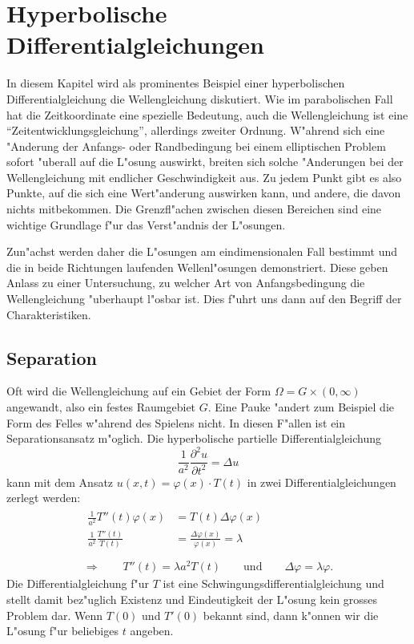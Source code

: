 %
%
%
\chapter{Hyperbolische Differentialgleichungen\label{chapter-hyperbolisch}}
\rhead{}
In diesem Kapitel wird als prominentes Beispiel einer hyperbolischen
Differentialgleichung die Wellengleichung diskutiert.
Wie im parabolischen Fall hat die Zeitkoordinate eine spezielle Bedeutung,
auch die Wellengleichung ist eine ``Zeitentwicklungsgleichung'', allerdings
zweiter Ordnung. W"ahrend sich eine "Anderung der Anfangs- oder Randbedingung
bei einem elliptischen Problem sofort "uberall auf die L"osung auswirkt,
breiten sich solche "Anderungen bei der Wellengleichung mit endlicher
Geschwindigkeit aus. Zu jedem Punkt gibt es also Punkte, auf die sich eine
Wert"anderung auswirken kann, und andere, die davon nichts mitbekommen.
Die Grenzfl"achen zwischen diesen Bereichen sind eine wichtige Grundlage
f"ur das Verst"andnis der L"osungen.

Zun"achst werden daher die L"osungen 
am eindimensionalen Fall bestimmt und die in beide Richtungen laufenden 
Wellenl"osungen demonstriert. Diese geben Anlass zu einer Untersuchung,
zu welcher Art von Anfangsbedingung die Wellengleichung "uberhaupt
l"osbar ist. Dies f"uhrt uns dann auf den Begriff der Charakteristiken.

\section{Separation}
Oft wird die Wellengleichung auf ein Gebiet der Form
$\Omega = G\times(0,\infty)$ angewandt, also ein 
festes Raumgebiet $G$.
Eine Pauke "andert zum Beispiel die Form des Felles w"ahrend des
Spielens nicht. In diesen F"allen ist ein Separationsansatz m"oglich.
Die hyperbolische partielle Differentialgleichung 
\[
\frac1{a^2}\frac{\partial^2 u}{\partial t^2}=\Delta u
\]
kann mit dem Ansatz $u(x,t)=\varphi(x)\cdot T(t)$ in zwei
Differentialgleichungen zerlegt werden:
\begin{gather*}
\begin{aligned}
\frac1{a^2}T''(t)\varphi(x)&=T(t)\Delta \varphi(x)\\
\frac1{a^2}\frac{T''(t)}{T(t)}&=\frac{\Delta\varphi(x)}{\varphi(x)}=\lambda\\
\end{aligned}
\\
\Rightarrow\qquad
T''(t)=\lambda a^2T(t)\qquad\text{und}\qquad\Delta \varphi=\lambda\varphi.
\end{gather*}
Die Differentialgleichung f"ur $T$ ist eine Schwingungsdifferentialgleichung
und stellt damit bez"uglich Existenz und Eindeutigkeit der L"osung
kein grosses Problem dar. Wenn $T(0)$ und $T'(0)$ bekannt sind, dann
k"onnen wir die L"osung f"ur beliebiges $t$ angeben.

